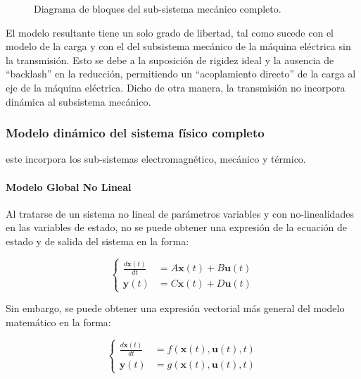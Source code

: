 \documentclass[a4paper, 10pt, onecolumn,journal]{ieeeconf}
\begin{document}
\begin{figure}[H]
    \centering
    \begin{adjustbox}{scale=0.7,max width=\columnwidth}
    \end{adjustbox}
    \caption{Diagrama de bloques del sub-sistema mecánico completo.}
    \label{diagrama de bloques sub-sistema mecanico completo}
\end{figure}

El modelo resultante tiene un solo grado de libertad, tal como sucede con el modelo de la
carga y con el del subsistema mecánico de la máquina eléctrica sin la transmisión.
Esto se debe a la suposición de rigidez ideal y la ausencia de ``backlash'' en la reducción, 
permitiendo un ``acoplamiento directo'' de la carga al eje de la máquina eléctrica.
Dicho de otra manera, la transmisión no incorpora dinámica al subsistema mecánico.

\vspace*{0.1cm}
\subsubsection{\textbf{Modelo dinámico del sistema físico completo}} este incorpora los sub-sistemas electromagnético, mecánico y térmico.

\paragraph{\textbf{Modelo Global No Lineal}}
Al tratarse de un sistema no lineal de parámetros variables y con no-linealidades en las variables de estado, no se puede obtener una expresión
de la ecuación de estado y de salida del sistema en la forma:

\begin{equation*}
    \begin{cases}
        \frac{d \mathbf{x}(t)}{dt} &= A \mathbf{x}(t) + B \mathbf{u}(t)\\
        \mathbf{y}(t) &= C \mathbf{x}(t) + D \mathbf{u}(t)
    \end{cases}
\end{equation*}

Sin embargo, se puede obtener una expresión vectorial más general del modelo matemático en la forma:

\begin{equation*}
    \begin{cases}
        \frac{d \mathbf{x}(t)}{dt} &= f(\mathbf{x}(t), \mathbf{u}(t), t)\\
        \mathbf{y}(t) &= g(\mathbf{x}(t), \mathbf{u}(t), t)
    \end{cases}
\end{equation*}
\end{document}
